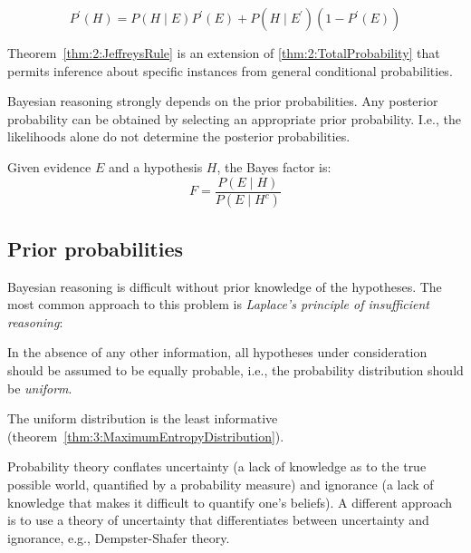 \begin{thm}
  \label{thm:2:JeffreysRule}
  \begin{equation}
    \label{eqn:2:JeffreysRule}
    P^\prime(H) = P(H \mid E) P^\prime(E) + P(H \mid E^\prime) (1 - P^\prime(E))
  \end{equation}
\end{thm}

Theorem~\ref{thm:2:JeffreysRule}
is an extension of \ref{thm:2:TotalProbability} that permits inference about
specific instances from general conditional probabilities.

Bayesian reasoning strongly depends on the prior probabilities.
Any posterior probability can be obtained by selecting an appropriate prior
probability.
I.e., the likelihoods alone do not determine the posterior probabilities.

\begin{dfn}
  \label{def:2:BayesFactor}

  Given evidence $E$ and a hypothesis $H$, the Bayes factor is:
  \begin{equation}
    \label{eqn:2:BayesFactor}
    F = \frac{P(E \mid H)}{P(E \mid H^c)}
  \end{equation}
\end{dfn}

\subsection{Prior probabilities}

Bayesian reasoning is difficult without prior knowledge of the hypotheses.
The most common approach to this problem is \textit{Laplace's principle of insufficient reasoning}:
\begin{displayquote}
  In the absence of any other information, all hypotheses under consideration
  should be assumed to be equally probable, i.e., the probability distribution
  should be \textit{uniform}.
\end{displayquote}
The uniform distribution is the least informative
(theorem~\ref{thm:3:MaximumEntropyDistribution}).

Probability theory conflates uncertainty (a lack of knowledge as to the true
possible world, quantified by a probability measure) and ignorance (a lack of
knowledge that makes it difficult to quantify one's beliefs).
A different approach is to use a theory of uncertainty that differentiates
between uncertainty and ignorance, e.g., Dempster-Shafer theory.

